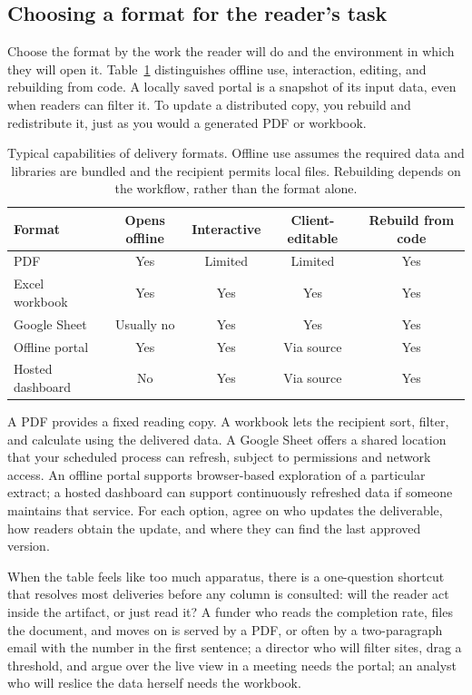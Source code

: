 \documentclass[
    a4paper,
    fontsize=10pt,
    twoside=true,
    numbers=noenddot,
]{kaobook}
\begin{document}
\subsection{Choosing a format for the reader's task}
Choose the format by the work the reader will do and the environment in which they will open it. Table~\ref{tab:formats} distinguishes offline use, interaction, editing, and rebuilding from code. A locally saved portal is a snapshot of its input data, even when readers can filter it. To update a distributed copy, you rebuild and redistribute it, just as you would a generated PDF or workbook.

\begin{table}[htbp]
\centering
\footnotesize
\caption[Delivery formats compared]{Typical capabilities of delivery formats. Offline use assumes the required data and libraries are bundled and the recipient permits local files. Rebuilding depends on the workflow, rather than the format alone.}
\label{tab:formats}
\begin{tabular}{lcccc}
\hline
Format & Opens offline & Interactive & Client-editable & Rebuild from code \\
\hline
PDF               & Yes & Limited & Limited & Yes \\
Excel workbook    & Yes & Yes & Yes & Yes \\
Google Sheet      & Usually no & Yes & Yes & Yes \\
Offline portal    & Yes & Yes & Via source & Yes \\
Hosted dashboard  & No & Yes & Via source & Yes \\
\hline
\end{tabular}
\end{table}

A PDF provides a fixed reading copy. A workbook lets the recipient sort, filter, and calculate using the delivered data. A Google Sheet offers a shared location that your scheduled process can refresh, subject to permissions and network access. An offline portal supports browser-based exploration of a particular extract; a hosted dashboard can support continuously refreshed data if someone maintains that service. For each option, agree on who updates the deliverable, how readers obtain the update, and where they can find the last approved version.

When the table feels like too much apparatus, there is a one-question shortcut that resolves most deliveries before any column is consulted: will the reader act inside the artifact, or just read it? A funder who reads the completion rate, files the document, and moves on is served by a PDF, or often by a two-paragraph email with the number in the first sentence; a director who will filter sites, drag a threshold, and argue over the live view in a meeting needs the portal; an analyst who will reslice the data herself needs the workbook.
\end{document}
